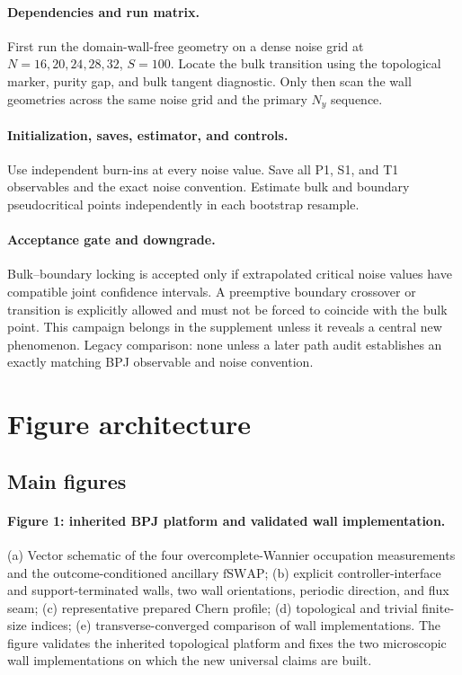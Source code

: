\documentclass[aps,prx,onecolumn,nofootinbib,superscriptaddress,longbibliography]{revtex4-2}
\newcommand{\mr}[1]{\mathrm{#1}}
\newcommand{\fSWAP}{\mr{fSWAP}}
\begin{document}
\paragraph{Dependencies and run matrix.}
First run the domain-wall-free geometry on a dense noise grid at
$N=16,20,24,28,32$, $S=100$.  Locate the bulk transition using the topological marker,
purity gap, and bulk tangent diagnostic.  Only then scan the wall geometries across the same
noise grid and the primary $N_y$ sequence.

\paragraph{Initialization, saves, estimator, and controls.}
Use independent burn-ins at every noise value.  Save all P1, S1, and T1 observables and the
exact noise convention.  Estimate bulk and boundary pseudocritical points independently in
each bootstrap resample.

\paragraph{Acceptance gate and downgrade.}
Bulk--boundary locking is accepted only if extrapolated critical noise values have compatible
joint confidence intervals.  A preemptive boundary crossover or transition is explicitly
allowed and must not be forced to coincide with the bulk point.  This campaign belongs in
the supplement unless it reveals a central new phenomenon.  Legacy comparison: none unless
a later path audit establishes an exactly matching BPJ observable and noise convention.

\section{Figure architecture}

\subsection{Main figures}
\paragraph{Figure 1: inherited BPJ platform and validated wall implementation.}
(a) Vector schematic of the four overcomplete-Wannier occupation measurements and the
outcome-conditioned ancillary $\fSWAP$; (b) explicit controller-interface and
support-terminated walls, two wall
orientations, periodic direction, and flux seam; (c) representative prepared Chern profile;
(d) topological and trivial finite-size indices; (e) transverse-converged comparison of wall
implementations.  The figure validates the inherited topological platform and fixes the
two microscopic wall implementations on which the new universal claims are built.
\end{document}
